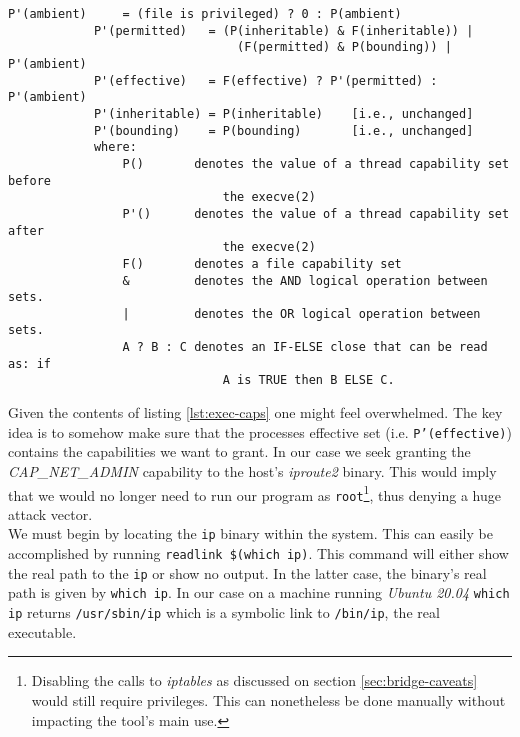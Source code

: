         \begin{lstlisting}[language = {}, caption = Transformation of Capabilities During \texttt{execve()}., label = lst:exec-caps]
            P'(ambient)     = (file is privileged) ? 0 : P(ambient)
            P'(permitted)   = (P(inheritable) & F(inheritable)) |
                                (F(permitted) & P(bounding)) | P'(ambient)
            P'(effective)   = F(effective) ? P'(permitted) : P'(ambient)
            P'(inheritable) = P(inheritable)    [i.e., unchanged]
            P'(bounding)    = P(bounding)       [i.e., unchanged]
            where:
                P()       denotes the value of a thread capability set before
                              the execve(2)
                P'()      denotes the value of a thread capability set after
                              the execve(2)
                F()       denotes a file capability set
                &         denotes the AND logical operation between sets.
                |         denotes the OR logical operation between sets.
                A ? B : C denotes an IF-ELSE close that can be read as: if
                              A is TRUE then B ELSE C.
        \end{lstlisting}

        Given the contents of listing \ref{lst:exec-caps} one might feel overwhelmed. The key idea is to somehow make sure that the processes effective set (i.e. \texttt{P'(effective)}) contains the capabilities we want to grant. In our case we seek granting the \textit{CAP\_NET\_ADMIN} capability to the host's \textit{iproute2} binary. This would imply that we would no longer need to run our program as \texttt{root}\footnote{Disabling the calls to \textit{iptables} as discussed on section \ref{sec:bridge-caveats} would still require privileges. This can nonetheless be done manually without impacting the tool's main use.}, thus denying a huge attack vector.\\

        We must begin by locating the \texttt{ip} binary within the system. This can easily be accomplished by running \texttt{\allowbreak readlink \$(which ip)}. This command will either show the real path to the \texttt{ip} or show no output. In the latter case, the binary's real path is given by \texttt{which ip}. In our case on a machine running \textit{Ubuntu 20.04} \texttt{which ip} returns \texttt{/usr/sbin/ip} which is a symbolic link to \texttt{/bin/ip}, the real executable.\\

